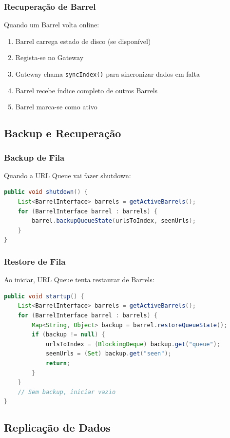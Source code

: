 \documentclass[12pt,a4paper]{article}
\begin{document}
\subsubsection{Recuperação de Barrel}
Quando um Barrel volta online:
\begin{enumerate}
    \item Barrel carrega estado de disco (se disponível)
    \item Regista-se no Gateway
    \item Gateway chama \texttt{syncIndex()} para sincronizar dados em falta
    \item Barrel recebe índice completo de outros Barrels
    \item Barrel marca-se como ativo
\end{enumerate}

\subsection{Backup e Recuperação}

\subsubsection{Backup de Fila}
Quando a URL Queue vai fazer shutdown:
\begin{lstlisting}[language=Java, caption={Backup para Barrels}]
public void shutdown() {
    List<BarrelInterface> barrels = getActiveBarrels();
    for (BarrelInterface barrel : barrels) {
        barrel.backupQueueState(urlsToIndex, seenUrls);
    }
}
\end{lstlisting}

\subsubsection{Restore de Fila}
Ao iniciar, URL Queue tenta restaurar de Barrels:
\begin{lstlisting}[language=Java, caption={Restore de backup}]
public void startup() {
    List<BarrelInterface> barrels = getActiveBarrels();
    for (BarrelInterface barrel : barrels) {
        Map<String, Object> backup = barrel.restoreQueueState();
        if (backup != null) {
            urlsToIndex = (BlockingDeque) backup.get("queue");
            seenUrls = (Set) backup.get("seen");
            return;
        }
    }
    // Sem backup, iniciar vazio
}
\end{lstlisting}

\subsection{Replicação de Dados}
\end{document}
